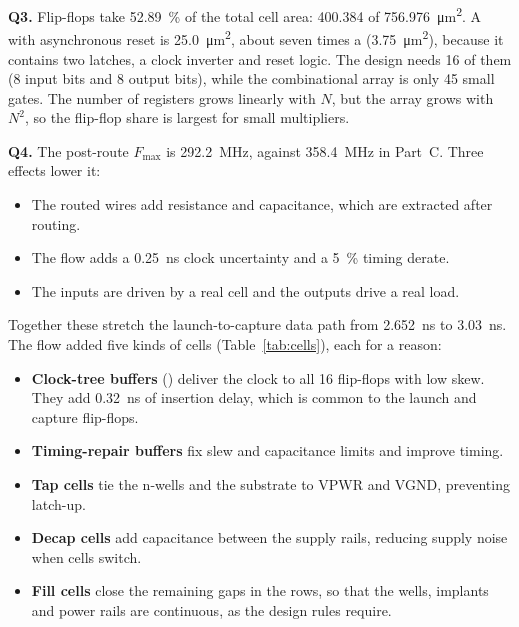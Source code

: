 \documentclass[conference,10pt]{IEEEtran}
\newcommand{\Fmax}{F_{\mathrm{max}}}
\begin{document}
\textbf{Q3.} Flip-flops take \SI{52.89}{\percent} of the total cell area: 400.384 of
\SI{756.976}{\square\micro\metre}. A  with asynchronous reset is
\SI{25.0}{\square\micro\metre}, about seven times a  (\SI{3.75}{\square\micro\metre}),
because it contains two latches, a clock inverter and reset logic. The design needs 16 of them
(8 input bits and 8 output bits), while the combinational array is only 45 small gates. The number
of registers grows linearly with $N$, but the array grows with $N^2$, so the flip-flop share is
largest for small multipliers.

\textbf{Q4.} The post-route $\Fmax$ is \SI{292.2}{\mega\hertz}, against \SI{358.4}{\mega\hertz} in
Part~C. Three effects lower it:
\begin{itemize}
\item The routed wires add resistance and capacitance, which are extracted after routing.
\item The flow adds a \SI{0.25}{\nano\second} clock uncertainty and a \SI{5}{\percent} timing
derate.
\item The inputs are driven by a real cell and the outputs drive a real load.
\end{itemize}
Together these stretch the launch-to-capture data path from \SI{2.652}{\nano\second} to
\SI{3.03}{\nano\second}. The flow added five kinds of cells (Table~\ref{tab:cells}), each for a
reason:
\begin{itemize}
\item \textbf{Clock-tree buffers} () deliver the clock to all 16 flip-flops with
low skew. They add \SI{0.32}{\nano\second} of insertion delay, which is common to the launch and
capture flip-flops.
\item \textbf{Timing-repair buffers} fix slew and capacitance limits and improve timing.
\item \textbf{Tap cells} tie the n-wells and the substrate to VPWR and VGND, preventing latch-up.
\item \textbf{Decap cells} add capacitance between the supply rails, reducing supply noise when
cells switch.
\item \textbf{Fill cells} close the remaining gaps in the rows, so that the wells, implants and
power rails are continuous, as the design rules require.
\end{itemize}
\end{document}

